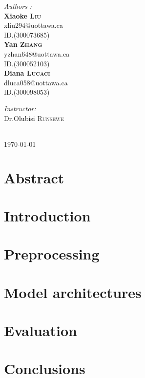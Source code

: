 \documentclass[10pt]{article}
\begin{document}
\begin{titlepage}
\begin{minipage}{0.4\textwidth}
\begin{flushleft} \large
\emph{Authors :}\\\textbf{Xiaoke \textsc{Liu}}\\xliu294@uottawa.ca\\ID.(300073685)
\\\textbf{Yan \textsc{Zhang}}\\yzhan648@uottawa.ca\\ID.(300052103)
\\\textbf{Diana \textsc{Lucaci}}\\dluca058@uottawa.ca\\ID.(300098053)
\end{flushleft}
\end{minipage}
\begin{minipage}{0.4\textwidth}
\begin{flushright} \large
\emph{Instructor:} \\
Dr.Olubisi \textsc{Runsewe}\\
\end{flushright}
\end{minipage}\\[0.5cm]
{\large \today}\\[1cm]

\vfill %

\end{titlepage}

\tableofcontents          %
\listoffigures
\listoftables
\newpage
\section{Abstract}


\section{Introduction}


\section{Preprocessing}


\section{Model architectures}


\section{Evaluation} \label{evaluation}



\section{Conclusions}

\clearpage


\begin{appendices}\label{app}

\end{appendices}
\end{document}
